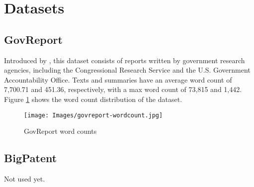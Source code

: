 \section{Datasets}


\subsection*{GovReport}

Introduced by \citet{huang-etal-2021-efficient}, this dataset consists of
reports written by government research agencies, including the Congressional
Research Service and the U.S. Government Accountability Office.
Texts and summaries have an average word count of 7,700.71 and 451.36,
respectively, with a max word count of 73,815 and 1,442.
Figure \ref{fig:govreport} shows the word count distribution of the dataset.

\begin{figure}[!ht]
	\centering
	\texttt{[image: Images/govreport-wordcount.jpg]}
	\caption{GovReport word counts}
	\label{fig:govreport}
\end{figure}


\subsection*{BigPatent}

Not used yet. \nocite{sharma-etal-2019-bigpatent}
